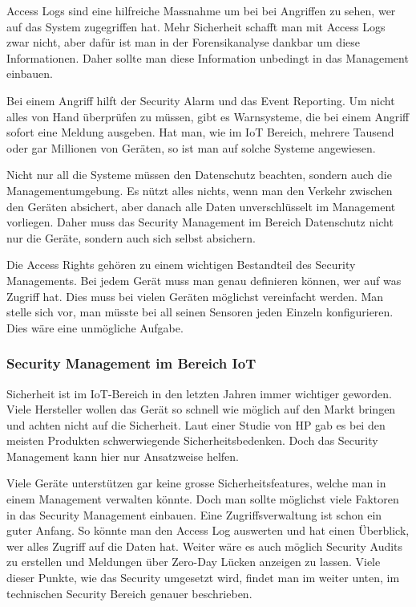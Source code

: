 Access Logs sind eine hilfreiche Massnahme um bei bei Angriffen zu sehen, wer auf das System zugegriffen hat. Mehr Sicherheit schafft man mit Access Logs zwar nicht, aber dafür ist man in der Forensikanalyse dankbar um diese Informationen. Daher sollte man diese Information unbedingt in das Management einbauen. 

Bei einem Angriff hilft der Security Alarm und das Event Reporting. Um nicht alles von Hand überprüfen zu müssen, gibt es Warnsysteme, die bei einem Angriff sofort eine Meldung ausgeben. Hat man, wie im IoT Bereich, mehrere Tausend oder gar Millionen von Geräten, so ist man auf solche Systeme angewiesen.

Nicht nur all die Systeme müssen den Datenschutz beachten, sondern auch die Managementumgebung. Es nützt alles nichts, wenn man den Verkehr zwischen den Geräten absichert, aber danach alle Daten unverschlüsselt im Management vorliegen. Daher muss das Security Management im Bereich Datenschutz nicht nur die Geräte, sondern auch sich selbst absichern.

Die Access Rights gehören zu einem wichtigen Bestandteil des Security Managements. Bei jedem Gerät muss man genau definieren können, wer auf was Zugriff hat. Dies muss bei vielen Geräten möglichst vereinfacht werden. Man stelle sich vor, man müsste bei all seinen Sensoren jeden Einzeln konfigurieren. Dies wäre eine unmögliche Aufgabe.
\subsubsection{Security Management im Bereich IoT}
Sicherheit ist im IoT-Bereich in den letzten Jahren immer wichtiger geworden. Viele Hersteller wollen das Gerät so schnell wie möglich auf den Markt bringen und achten nicht auf die Sicherheit. Laut einer Studie von HP gab es bei den meisten Produkten schwerwiegende Sicherheitsbedenken.\cite{SecOverview} Doch das Security Management kann hier nur Ansatzweise helfen.

Viele Geräte unterstützen gar keine grosse Sicherheitsfeatures, welche man in einem Management verwalten könnte. Doch man sollte möglichst viele Faktoren in das Security Management einbauen.
Eine Zugriffsverwaltung ist schon ein guter Anfang. So könnte man den Access Log auswerten und hat einen Überblick, wer alles Zugriff auf die Daten hat. Weiter wäre es auch möglich Security Audits zu erstellen und Meldungen über Zero-Day Lücken anzeigen zu lassen. Viele dieser Punkte, wie das Security umgesetzt wird, findet man im weiter unten, im technischen Security Bereich genauer beschrieben.



\section{}